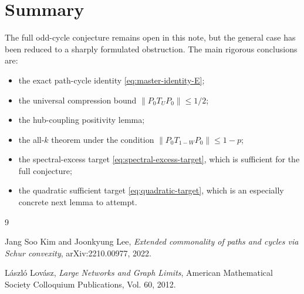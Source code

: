 \documentclass[11pt]{article}
\theoremstyle{definition}
\theoremstyle{remark}
\begin{document}
\section{Summary}

The full odd-cycle conjecture remains open in this note, but the general case has been reduced to a sharply formulated obstruction.  The main rigorous conclusions are:
\begin{itemize}[leftmargin=2em]
  \item the exact path-cycle identity \eqref{eq:master-identity-E};
  \item the universal compression bound $\|P_0T_UP_0\|\le1/2$;
  \item the hub-coupling positivity lemma;
  \item the all-$k$ theorem under the condition $\|P_0T_{1-W}P_0\|\le1-p$;
  \item the spectral-excess target \eqref{eq:spectral-excess-target}, which is sufficient for the full conjecture;
  \item the quadratic sufficient target \eqref{eq:quadratic-target}, which is an especially concrete next lemma to attempt.
\end{itemize}

\begin{thebibliography}{9}

Jang Soo Kim and Joonkyung Lee,
\emph{Extended commonality of paths and cycles via Schur convexity},
arXiv:2210.00977, 2022.

L\'aszl\'o Lov\'asz,
\emph{Large Networks and Graph Limits},
American Mathematical Society Colloquium Publications, Vol. 60, 2012.

\end{thebibliography}
\end{document}
